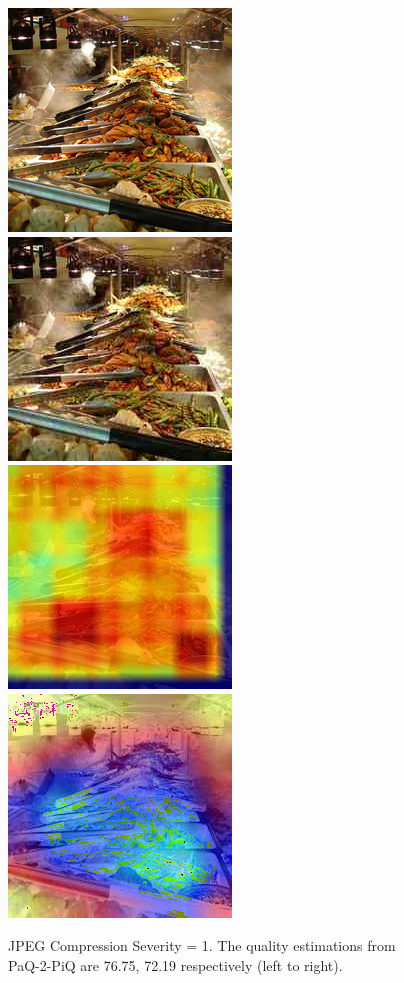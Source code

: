 \documentclass[10pt,twocolumn,letterpaper]{article}
\begin{document}
\begin{figure}[!ht]
	\includegraphics[width=.49\columnwidth]{Images/test_images/severity=0/buffet.png}\hfill
	\includegraphics[width=.49\columnwidth]{Images/test_images/severity=1/jpeg_compression/buffet.png}\hfill
	\\[\smallskipamount]
    \includegraphics[width=.49\columnwidth]{Images/saliency_maps/paq2piq/severity=1/jpeg_compression/buffet.png}\hfill
	\includegraphics[width=.49\columnwidth]{Images/saliency_maps/resnet18/severity=1/jpeg_compression/buffet.png}\hfill
	\caption{JPEG Compression Severity = 1. The quality estimations from PaQ-2-PiQ are 76.75, 72.19 respectively (left to right).}
\end{figure}
\end{document}
